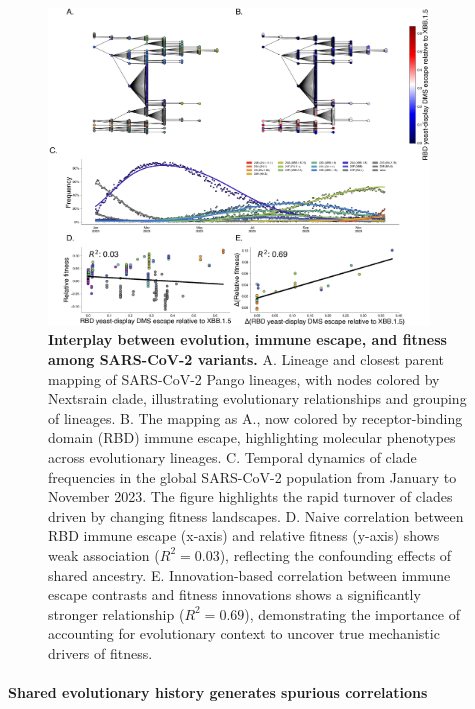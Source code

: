 \begin{figure}[h]
    \centering
    \includegraphics[width=0.9\textwidth]{./figures/interplay_phylo_escape_fitness.png}

    \caption{
	\textbf{Interplay between evolution, immune escape, and fitness among SARS-CoV-2 variants.}
	A. Lineage and closest parent mapping of SARS-CoV-2 Pango lineages, with nodes colored by Nextsrain clade, illustrating evolutionary relationships and grouping of lineages.
	B. The mapping as A., now colored by receptor-binding domain (RBD) immune escape, highlighting molecular phenotypes across evolutionary lineages.
	C. Temporal dynamics of clade frequencies in the global SARS-CoV-2 population from January to November 2023. The figure highlights the rapid turnover of clades driven by changing fitness landscapes.
	D. Naive correlation between RBD immune escape (x-axis) and relative fitness (y-axis) shows weak association ($R^2 = 0.03$), reflecting the confounding effects of shared ancestry.
	E. Innovation-based correlation between immune escape contrasts and fitness innovations shows a significantly stronger relationship ($R^2 = 0.69$), demonstrating the importance of accounting for evolutionary context to uncover true mechanistic drivers of fitness.
    }
    \label{fig:interplay_phylo_escape_fitness}
\end{figure}

\paragraph{Shared evolutionary history generates spurious correlations}

